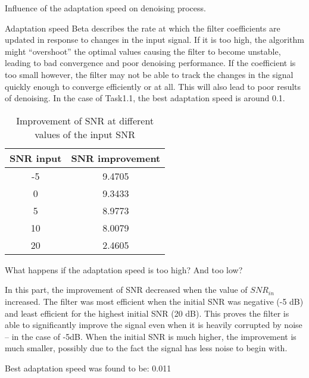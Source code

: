 \documentclass{article}
\begin{document}
Influence of the adaptation speed on denoising process.

Adaptation speed Beta describes the rate at which the filter
coefficients are updated in response to changes in the input
signal. If it is too high, the algorithm might “overshoot”
the optimal values causing the filter to become unstable,
leading to bad convergence and poor denoising performance.
If the coefficient is too small however, the filter may not
be able to track the changes in the signal quickly enough to
converge efficiently or at all. This will also lead to poor
results of denoising. In the case of Task1.1,  the best
adaptation speed is around 0.1.

\begin{table}[ht!]
  \begin{center}
    \caption{Improvement of SNR at different values of the input SNR}
        \label{tab:task2tab}
        \begin{tabular}{c|c} 
        \textbf{SNR input} & \textbf{SNR improvement} \\
        \hline
        -5 & 9.4705 \\
        0 & 9.3433 \\
        5 & 8.9773 \\
        10 & 8.0079 \\
        20 & 2.4605 \\
    \end{tabular}
  \end{center}
\end{table}

What happens if the adaptation speed is too high? And too low?

In this part, the improvement of SNR decreased when the
value of $SNR_{in}$ increased. The filter was most efficient
when the initial SNR was negative (-5 dB) and least
efficient for the highest initial SNR (20 dB). This proves
the filter is able to significantly improve the signal even
when it is heavily corrupted by noise – in the case of -5dB.
When the initial SNR is much higher, the improvement is much
smaller, possibly due to the fact the signal has less noise
to begin with.

Best adaptation speed was found to be: 0.011
\end{document}
